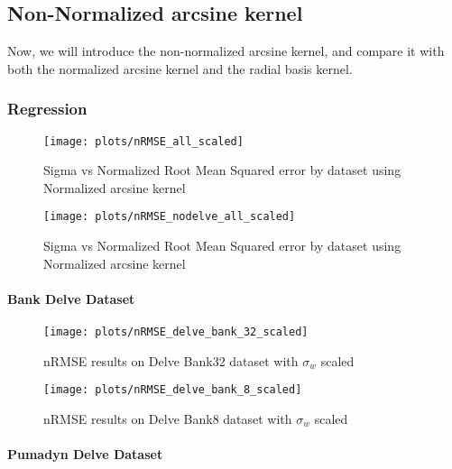 
\subsection{Non-Normalized arcsine kernel}

Now, we will introduce the non-normalized arcsine kernel, and compare it with
both the normalized arcsine kernel and the radial basis kernel.

\subsubsection{Regression}



\begin{figure}[H]
    \texttt{[image: plots/nRMSE\_all\_scaled]}
    \caption{Sigma vs Normalized Root Mean Squared error by dataset using Normalized arcsine kernel}%
    \label{fig:nrmse-all-scaled}
\end{figure}

\begin{figure}[H]
    \texttt{[image: plots/nRMSE\_nodelve\_all\_scaled]}
    \caption{Sigma vs Normalized Root Mean Squared error by dataset using Normalized arcsine kernel}%
    \label{fig:nrmse-all-scaled}
\end{figure}

\paragraph{Bank Delve Dataset}


\begin{figure}[H]
    \texttt{[image: plots/nRMSE\_delve\_bank\_32\_scaled]}
    \caption{nRMSE results on Delve Bank32 dataset with $\sigma_w$ scaled}
    \label{fig:nrmse-delve-all-bank-32-scaled}
\end{figure}

\begin{figure}[H]
    \texttt{[image: plots/nRMSE\_delve\_bank\_8\_scaled]}
    \caption{nRMSE results on Delve Bank8 dataset with $\sigma_w$ scaled}
    \label{fig:nrmse-delve-bank-8-scaled}
\end{figure}


\paragraph{Pumadyn Delve Dataset}

